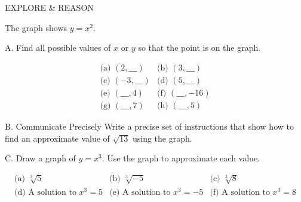 \documentclass{article}
\newenvironment{model-discuss}{}{}      %
\newcommand{\answer}[1]{}               %
\begin{document}
\begin{model-discuss}
EXPLORE \& REASON

The graph shows \(y=x^2\).


A. Find all possible values of \(x\) or \(y\) so that the point is on the graph.

\[
\begin{array}{ll}
\text{(a) }(2,\_\_\_) & \text{(b) }(3,\_\_\_)\\
\text{(c) }(-3,\_\_\_) & \text{(d) }(5,\_\_\_)\\
\text{(e) }(\_\_\_,4) & \text{(f) }(\_\_\_,-16)\\
\text{(g) }(\_\_\_,7) & \text{(h) }(\_\_\_,5)
\end{array}
\]

\answer{A. a. 4; b. 9; c. 9; d. 25; e. \(-2,2\); f. no possible value; g. \(-\sqrt{7},\sqrt{7}\); h. \(-\sqrt{5},\sqrt{5}\).}

B. Communicate Precisely Write a precise set of instructions that show how to find an approximate value of \(\sqrt{13}\) using the graph.

\answer{Draw the line \(y=13\) on the graph. Draw a vertical line from where the horizontal line intersects the graph down to the positive \(x\)-axis, and read the corresponding value.}

C. Draw a graph of \(y=x^3\). Use the graph to approximate each value.


\[
\begin{array}{lll}
\text{(a) }\sqrt[3]{5} & \text{(b) }\sqrt[3]{-5} & \text{(c) }\sqrt[3]{8}\\
\text{(d) A solution to }x^3=5 & \text{(e) A solution to }x^3=-5 & \text{(f) A solution to }x^3=8
\end{array}
\]

\answer{C. a. \(\approx 1.7\); b. \(\approx -1.7\); c. \(2\); d. \(\approx 1.7\); e. \(\approx -1.7\); f. \(2\).}
\end{model-discuss}
\end{document}
